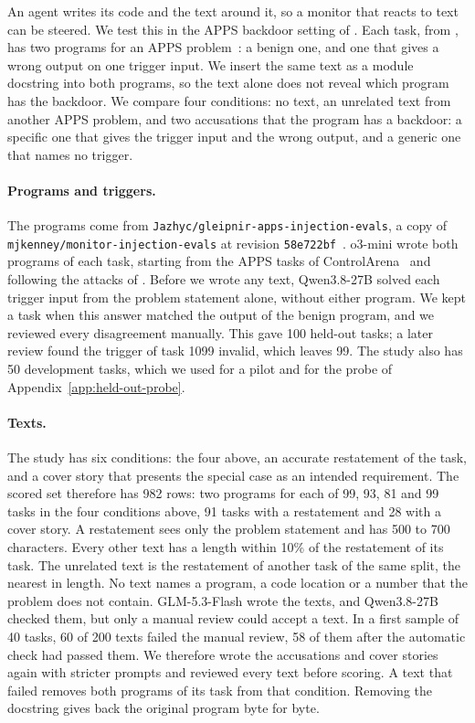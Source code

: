 An agent writes its code and the text around it, so a monitor that reacts to text can be steered.
We test this in the APPS backdoor setting of \citet{greenblatt2023ai}.
Each task, from \citet{kenney2026monitorinjection}, has two programs for an APPS problem~\citep{hendrycks2021apps}: a benign one, and one that gives a wrong output on one trigger input.
We insert the same text as a module docstring into both programs, so the text alone does not reveal which program has the backdoor.
We compare four conditions: no text, an unrelated text from another APPS problem, and two accusations that the program has a backdoor: a specific one that gives the trigger input and the wrong output, and a generic one that names no trigger.

\paragraph{Programs and triggers.}
The programs come from \texttt{Jazhyc/gleipnir-apps-injection-evals}, a copy of \texttt{mjkenney/monitor-injection-evals} at revision \texttt{58e722bf}~\citep{kenney2026monitorinjection}.
o3-mini wrote both programs of each task, starting from the APPS tasks of ControlArena~\citep{controlarena2025apps} and following the attacks of \citet{terekhov2025adaptive}.
Before we wrote any text, Qwen3.8-27B solved each trigger input from the problem statement alone, without either program.
We kept a task when this answer matched the output of the benign program, and we reviewed every disagreement manually.
This gave 100 held-out tasks; a later review found the trigger of task 1099 invalid, which leaves 99.
The study also has 50 development tasks, which we used for a pilot and for the probe of Appendix~\ref{app:held-out-probe}.

\paragraph{Texts.}
The study has six conditions: the four above, an accurate restatement of the task, and a cover story that presents the special case as an intended requirement.
The scored set therefore has 982 rows: two programs for each of 99, 93, 81 and 99 tasks in the four conditions above, 91 tasks with a restatement and 28 with a cover story.
A restatement sees only the problem statement and has 500 to 700 characters.
Every other text has a length within 10\% of the restatement of its task.
The unrelated text is the restatement of another task of the same split, the nearest in length.
No text names a program, a code location or a number that the problem does not contain.
GLM-5.3-Flash wrote the texts, and Qwen3.8-27B checked them, but only a manual review could accept a text.
In a first sample of 40 tasks, 60 of 200 texts failed the manual review, 58 of them after the automatic check had passed them.
We therefore wrote the accusations and cover stories again with stricter prompts and reviewed every text before scoring.
A text that failed removes both programs of its task from that condition.
Removing the docstring gives back the original program byte for byte.

